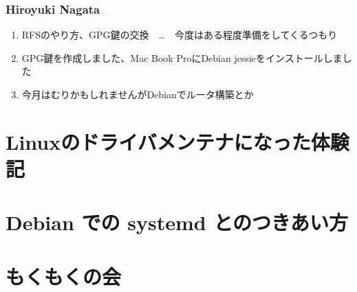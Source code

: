 \documentclass[cjk,dvipdfmx,10pt,compress,%
hyperref={bookmarks=true,bookmarksnumbered=true,bookmarksopen=false,%
colorlinks=false,%
pdftitle={第 85 回 関西 Debian 勉強会},%
pdfauthor={倉敷・のがた・佐々木・かわだ・八津尾},%
pdfsubject={資料},%
}]{beamer}
\begin{document}
\begin{frame}
  \frametitle{ Hiroyuki Nagata }
  \begin{enumerate}
  \item RFSのやり方、GPG鍵の交換　…　今度はある程度準備をしてくるつもり
  \item GPG鍵を作成しました、Mac Book ProにDebian jessieをインストールしました
  \item 今月はむりかもしれませんがDebianでルータ構築とか
  \end{enumerate}
\end{frame}


\section{Linuxのドライバメンテナになった体験記}


\section{Debian での systemd とのつきあい方}


\section{もくもくの会}

\end{document}
